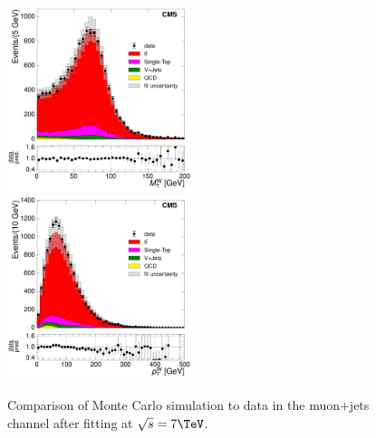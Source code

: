 \begin{figure}[hbtp]
     \includegraphics[width=0.48\textwidth]{Chapters/04_Analysis/04b_XSections/images/control_plots/after_fit/7TeV/MuPlusJets_patType1CorrectedPFMet_MT_2orMoreBtags_with_ratio.pdf}\\     
	 \includegraphics[width=0.48\textwidth]{Chapters/04_Analysis/04b_XSections/images/control_plots/after_fit/7TeV/MuPlusJets_patType1CorrectedPFMet_WPT_2orMoreBtags_with_ratio.pdf}\hfill
	 \caption{Comparison of Monte Carlo simulation to data in the muon+jets channel after fitting at
	 $\sqrt{s}=7\TeV$.}
     \label{fig:data_mc_comparison_after_fit_7TeV_muon}
\end{figure}

